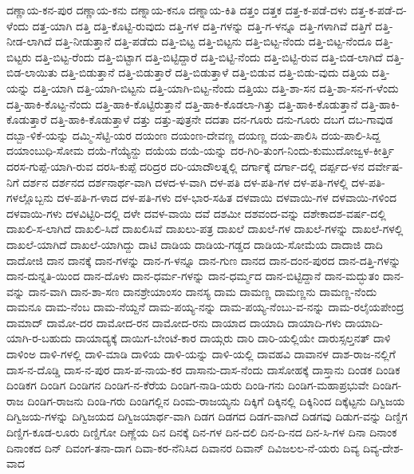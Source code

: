 {ದಣ್ಣಾಯ-ಕನ-ಪುರ
ದಣ್ಣಾಯ-ಕನು
ದಣ್ನಾಯ-ಕನೂ
ದಣ್ನಾಯ-ಕಿತಿ
ದತ್ತಂ
ದತ್ತಕ
ದತ್ತ-ಕ-ಪಡೆ-ದಳು
ದತ್ತ-ಕ-ಪಡೆ-ದ-ಳೆಂದು
ದತ್ತ-ಯಾಗಿ
ದತ್ತಿ
ದತ್ತಿ-ಕೊಟ್ಟಿ-ರುವುದು
ದತ್ತಿ-ಗಳ
ದತ್ತಿ-ಗಳನ್ನು
ದತ್ತಿ-ಗ-ಳನ್ನೂ
ದತ್ತಿ-ಗಳಾಗಿವೆ
ದತ್ತಿಗೆ
ದತ್ತಿ-ನೀಡ-ಲಾಗಿದೆ
ದತ್ತಿ-ನೀಡುತ್ತಾನೆ
ದತ್ತಿ-ಪಡೆದು
ದತ್ತಿ-ಬಿಟ್ಟ
ದತ್ತಿ-ಬಿಟ್ಟನು
ದತ್ತಿ-ಬಿಟ್ಟ-ನೆಂದು
ದತ್ತಿ-ಬಿಟ್ಟ-ನೆಂದೂ
ದತ್ತಿ-ಬಿಟ್ಟರು
ದತ್ತಿ-ಬಿಟ್ಟ-ರೆಂದು
ದತ್ತಿ-ಬಿಟ್ಟಾಗ
ದತ್ತಿ-ಬಿಟ್ಟಿದ್ದಾರೆ
ದತ್ತಿ-ಬಿಟ್ಟಿ-ನೆಂದು
ದತ್ತಿ-ಬಿಟ್ಟಿ-ರುವ
ದತ್ತಿ-ಬಿಡ-ಲಾಗಿದೆ
ದತ್ತಿ-ಬಿಡ-ಲಾಯಿತು
ದತ್ತಿ-ಬಿಡುತ್ತಾನೆ
ದತ್ತಿ-ಬಿಡುತ್ತಾರೆ
ದತ್ತಿ-ಬಿಡುತ್ತಾಳೆ
ದತ್ತಿ-ಬಿಡುವ
ದತ್ತಿ-ಬಿಡು-ವುದು
ದತ್ತಿಯ
ದತ್ತಿ-ಯನ್ನು
ದತ್ತಿ-ಯಾಗಿ
ದತ್ತಿ-ಯಾಗಿ-ಬಿಟ್ಟನು
ದತ್ತಿ-ಯಾಗಿ-ಬಿಟ್ಟ-ನೆಂದು
ದತ್ತಿಯು
ದತ್ತಿ-ಶಾ-ಸನ
ದತ್ತಿ-ಶಾ-ಸನ-ಗ-ಳೆಂದು
ದತ್ತಿ-ಹಾಕಿ-ಕೊಟ್ಟ-ನೆಂದು
ದತ್ತಿ-ಹಾಕಿ-ಕೊಟ್ಟಿರುತ್ತಾನೆ
ದತ್ತಿ-ಹಾಕಿ-ಕೊಡಲಾ-ಗಿತ್ತು
ದತ್ತಿ-ಹಾಕಿ-ಕೊಡುತ್ತಾನೆ
ದತ್ತಿ-ಹಾಕಿ-ಕೊಡುತ್ತಾರೆ
ದತ್ತಿ-ಹಾಕಿ-ಕೊಡುತ್ತಾಳೆ
ದತ್ತು
ದತ್ತು-ಪುತ್ರನೇ
ದದತಾ
ದನ-ಗೂರು
ದನು-ಗೂರು
ದಬಗ
ದಬ-ಗಾವುಡ
ದಬ್ಬಾ-ಳಿಕೆ-ಯನ್ನು
ದಮ್ಮಿ-ಸೆಟ್ಟಿ-ಯರ
ದಯಂಣ
ದಯಂಣ-ದೇವಣ್ಣ
ದಯಣ್ಣ
ದಯ-ಪಾಲಿಸಿ
ದಯ-ಪಾಲಿ-ಸಿದ್ದ
ದಯಾಂಬುಧಿ-ಸೋಮ
ದಯೆ-ಗೆಯ್ಯೆನ್ದು
ದಯೆಯ
ದಯೆ-ಯನ್ನು
ದರ-ಗಿರಿ-ತುಂಗ-ನಿಂದು-ಕುಮುದೋಜ್ವಳ-ಕೀರ್ತ್ತಿ
ದರಸ-ಗುಪ್ಪೆ-ಯಾಗಿ-ರುವ
ದರಸಿ-ಕುಪ್ಪೆ
ದರಿದ್ರರ
ದರಿ-ಯಾದೌಲತ್ನಲ್ಲಿ
ದರ್ಗಾಕ್ಕೆ
ದರ್ಗಾ-ದಲ್ಲಿ
ದರ್ಪ್ಪದ-ಳನ
ದರ್ವೇಷ-ನಿಗೆ
ದರ್ಶನ
ದರ್ಶನದ
ದರ್ಶನಾರ್ಥ-ವಾಗಿ
ದಳದ-ಳ-ವಾಗಿ
ದಳ-ಪತಿ
ದಳ-ಪತಿ-ಗಳ
ದಳ-ಪತಿ-ಗಳಲ್ಲಿ
ದಳ-ಪತಿ-ಗಳಲ್ಲೊಬ್ಬನು
ದಳ-ಪತಿ-ಗ-ಳಾದ
ದಳ-ಪತಿ-ಗಳು
ದಳ-ಭಾರ-ಸಹಿತ
ದಳವಾಯಿ
ದಳವಾಯಿ-ಗಳ
ದಳವಾಯಿ-ಗಳಿಂದ
ದಳವಾಯಿ-ಗಳು
ದಳವಿಟ್ಟಿರಿ-ದಲ್ಲಿ
ದಳೇ
ದವಳ-ವಾಯಿ
ದವೆ
ದಶಮೀ
ದಶವಂದ-ವನ್ನು
ದಶೇಕಾದಶ-ವರ್ಷ-ದಲ್ಲಿ
ದಾಖಲಿ-ಸ-ಲಾಗಿದೆ
ದಾಖಲಿ-ಸಿದೆ
ದಾಖಲಿಸಿವೆ
ದಾಖಲು-ಪತ್ರ
ದಾಖಲೆ
ದಾಖಲೆ-ಗಳ
ದಾಖಲೆ-ಗಳನ್ನು
ದಾಖಲೆ-ಗಳಲ್ಲಿ
ದಾಖಲೆ-ಯಾಗಿದೆ
ದಾಖಲೆ-ಯಾಗಿದ್ದು
ದಾಟಿ
ದಾಡಿಯ
ದಾಡಿಯ-ಗಡ್ಡದ
ದಾಡಿಯ-ಸೋಮೆಯ
ದಾದಾಜಿ
ದಾದಿ
ದಾದೋಜಿ
ದಾನ
ದಾನಕ್ಕೆ
ದಾನ-ಗಳನ್ನು
ದಾನ-ಗ-ಳನ್ನೂ
ದಾನ-ಗುಣ
ದಾನದ
ದಾನ-ದಂನ-ಪುರದ
ದಾನ-ದತ್ತಿ-ಗಳನ್ನು
ದಾನ-ದುನ್ನತಿ-ಯಿಂದ
ದಾನ-ದೊಳು
ದಾನ-ಧರ್ಮ-ಗಳನ್ನು
ದಾನ-ಧರ್ಮ್ಮದ
ದಾನ-ಬಿಟ್ಟಿದ್ದಾನೆ
ದಾನ-ಮದ್ಭುತಂ
ದಾನ-ವನ್ನು
ದಾನ-ವಾಗಿ
ದಾನ-ಶಾ-ಸಣ
ದಾನಶ್ರೇಯಾಂಸಂ
ದಾನಸ್ಯ
ದಾಮ
ದಾಮಣ್ಣ
ದಾಮಣ್ಣನು
ದಾಮಣ್ಣ-ನೆಂದು
ದಾಮನೂ
ದಾಮ-ನೆಂಬ
ದಾಮ-ನೆಯ್ದನೆ
ದಾಮ-ಪಯ್ಯ-ನನ್ನು
ದಾಮ-ಪಯ್ಯ-ನೆಂಬು-ವ-ನನ್ನು
ದಾಮ-ರಲೈಯಪೇಂದ್ರ
ದಾಮಾದ್
ದಾಮೋ-ದರ
ದಾಮೋದ-ರನ
ದಾಮೋದ-ರನು
ದಾಯಾದ
ದಾಯಾದಿ
ದಾಯಾದಿ-ಗಳು
ದಾಯಾದಿ-ಯಾಗಿ-ರ-ಬಹುದು
ದಾಯಾದ್ಯಕ್ಕೆ
ದಾಯಿಗ-ಬೇಂಟೆ-ಕಾರ
ದಾಯ್ಗರು
ದಾರಿ
ದಾರಿ-ಯಲ್ಲಿಯೇ
ದಾರುಸ್ಸಲ್ತನತ್
ದಾಳಿ
ದಾಳಿಂಅ
ದಾಳಿ-ಗಳಲ್ಲಿ
ದಾಳಿ-ಮಾಡಿ
ದಾಳಿಯ
ದಾಳಿ-ಯನ್ನು
ದಾಳಿ-ಯಲ್ಲಿ
ದಾವಹವಿ
ದಾವಾನಳ
ದಾಶ-ರಾಜ-ನಲ್ಲಿಗೆ
ದಾಸ-ನ-ದೊಡ್ಡಿ
ದಾಸ-ನ-ಪುರ
ದಾಸ-ಪ-ನಾಯ-ಕರ
ದಾಸಾನು-ದಾಸ-ನೆಂದು
ದಾಸೋಹಕ್ಕೆ
ದಾಸ್ತಾನು
ದಿಂಡಕ
ದಿಂಡಿಕ
ದಿಂಡಿಕಗ
ದಿಂಡಿಗ
ದಿಂಡಿಗನ
ದಿಂಡಿಗ-ನ-ಕೆರೆಯ
ದಿಂಡಿಗ-ನಾಡಿ-ಯರು
ದಿಂಡಿ-ಗನು
ದಿಂಡಿಗ-ಮಹಾಪ್ರಭುವೇ
ದಿಂಡಿಗ-ರಾಜ
ದಿಂಡಿಗ-ರಾಜನು
ದಿಂಡಿ-ಗರು
ದಿಂಡಿಗಲ್ಲಿನ
ದಿಂಮ-ರಾಜಯ್ಯನು
ದಿಕ್ಕಿಗೆ
ದಿಕ್ಕಿನಲ್ಲಿ
ದಿಕ್ಕಿನಿಂದ
ದಿಕ್ಕೆಟ್ಟನು
ದಿಗ್ವಿಜಯ
ದಿಗ್ವಿಜಯ-ಗಳನ್ನು
ದಿಗ್ವಿಜಯದ
ದಿಗ್ವಿಜಯಾರ್ಥ-ವಾಗಿ
ದಿಡಗ
ದಿಡಗದ
ದಿಡಗ-ವಾಗಿದೆ
ದಿಡಗವು
ದಿಡುಗ-ವನ್ನು
ದಿಣ್ಡಿಗ
ದಿಣ್ಡಿಗ-ಕೂಡ-ಲೂರು
ದಿಣ್ಡಿಗೋ
ದಿಣ್ಣೆಯ
ದಿನ
ದಿನಕ್ಕೆ
ದಿನ-ಗಳ
ದಿನ-ದಲಿ
ದಿನ-ದಿ-ನದ
ದಿನ-ಸಿ-ಗಳ
ದಿನಾ
ದಿನಾಂಕ
ದಿನಾಂಕದ
ದಿನ್
ದಿವಂಗ-ತನಾ-ದಾಗ
ದಿವಾ-ಕರ-ನೆನಿಸಿದ
ದಿವಾನರ
ದಿವಾನ್
ದಿವಿಜಲಲ-ನೆ-ಯರು
ದಿವ್ಯ
ದಿವ್ಯ-ದೇಶ-ವಾದ
}
